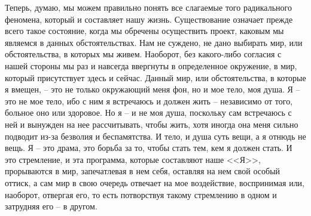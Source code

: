 Теперь, думаю, мы можем правильно понять все слагаемые того радикального 
феномена, который и составляет нашу жизнь. Существование означает прежде всего 
такое состояние, когда мы обречены осуществить проект, каковым мы являемся в 
данных обстоятельствах. Нам не суждено, не дано выбирать мир, или 
обстоятельства, в которых мы живем. Наоборот, без какого-либо согласия с нашей 
стороны мы раз и навсегда ввергнуты в определенное окружение, в мир, который 
присутствует здесь и сейчас. Данный мир, или обстоятельства, в которые я 
вмещен, -- это не только окружающий меня фон, но и мое тело, моя душа. Я -- 
это не мое тело, ибо с ним я встречаюсь и должен жить -- независимо от того, 
больное оно или здоровое. Но я -- и не моя душа, поскольку сам встречаюсь с 
ней и вынужден на нее рассчитывать, чтобы жить, хотя иногда она меня сильно 
подводит из-за безволия и беспамятства. И тело, и душа суть вещи, а я отнюдь 
не вещь. Я -- это драма, это борьба за то, чтобы стать тем, кем я должен 
стать. И это стремление, и эта программа, которые составляют наше <<Я>>, 
прорываются в мир, запечатлевая в нем себя, оставляя на нем свой особый 
оттиск, а сам мир в свою очередь отвечает на мое воздействие, воспринимая 
или, наоборот, отвергая его, то есть потворствуя такому стремлению в одном и 
затрудняя его -- в другом.

